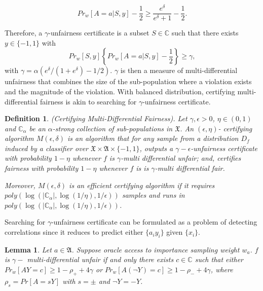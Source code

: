 \documentclass{article}
\newtheorem{lem}[thm]{Lemma}
\newtheorem{defn}{Definition}[section]
\begin{document}
\begin{equation}
    \label{eq: mdf_viol1}
    Pr_{w}[A=a |S, y] - \frac{1}{2}\geq \frac{e^{\delta}}{e^{\delta} + 1} - \frac{1}{2}. 
\end{equation}

Therefore, a $\gamma$-unfairness certificate is a subset $S\in \mathbb{C}$ such that there exists $y\in \{-1, 1\}$ with
\begin{equation}
\label{eq: unfair}
    Pr_{w}[S, y]\left\{Pr_{w}[A=a |S, y] -\frac{1}{2}\right\}\geq \gamma,
\end{equation}
with $\gamma =\alpha \left(e^{\delta}/(1+e^{\delta})-1/2\right)$. $\gamma$ is then a measure of multi-differential unfairness that combines the size of the sub-population where a violation exists and the magnitude of the violation. With balanced distribution, certifying multi-differential fairness is akin to searching for $\gamma$-unfairness certificate. 

\begin{defn}(Certifying Multi-Differential Fairness). 
Let $\gamma, \epsilon >0$, $\eta\in (0, 1)$ and $\mathbb{C}_{\alpha}$ be an $\alpha$-strong collection of sub-populations in $\mathfrak{X}$. An $(\epsilon, \eta)$- certifying algorithm $M(\epsilon, \delta)$ is an algorithm that for any sample from a distribution $D_{f}$ induced by a classifier over $\mathfrak{X} \times \mathfrak{A}\times \{-1, 1\}$, outputs a $\gamma-\epsilon$-unfairness certificate with probability $1-\eta$ whenever $f$ is $ \gamma$-multi differential unfair; and, certifies fairness with probability $1-\eta$ whenever $f$ is is $\gamma$-multi differential fair. 

\bigskip
Moreover, $M(\epsilon, \delta)$ is an efficient certifying algorithm if it requires $poly(\log(|\mathbb{C}_{\alpha}|, \log(1/\eta), 1/\epsilon))$ samples and runs in $poly(\log(|\mathbb{C}_{\alpha}|, \log(1/\eta), 1/\epsilon))$. 
\end{defn}

Searching for $\gamma$-unfairness certificate can be formulated as a problem of detecting correlations since it reduces to predict either $\{a_{i}y_{i}\}$ given $\{x_{i}\}$.
\begin{lem}
	\label{lem: 1}
	Let $a\in \mathfrak{A}$. Suppose oracle access to importance sampling weight $w_{a}$. $f$ is $\gamma-$ multi-differential unfair if and only there exists $c\in \mathbb{C}$ such that either $Pr_{w}[AY=c] \geq 1 - \rho_{+} + 4\gamma$ or $Pr_{w}[A(\neg Y)=c] \geq 1 - \rho_{-} + 4\gamma$, where $\rho_s=Pr[A=sY]$ with $s=\pm$ and $\neg Y = -Y$. 
\end{lem}
\end{document}
